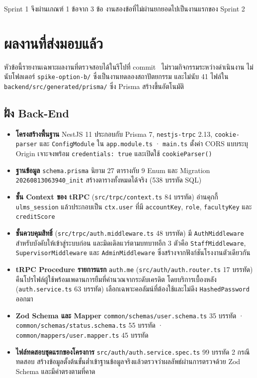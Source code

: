 \vspace{0.8em}
\noindent Sprint 1 จึงผ่านเกณฑ์ 1 ข้อจาก 3 ข้อ งานสองข้อที่ไม่ผ่านยกยอดไปเป็นงานแรกของ Sprint 2

\clearpage
\section{ผลงานที่ส่งมอบแล้ว}

หัวข้อนี้รายงานเฉพาะผลงานที่ตรวจสอบได้ในรีโปที่ commit \headsha\ ไม่รวมกิจกรรมระหว่างดำเนินงาน ไม่นับโฟลเดอร์ \texttt{spike-option-b/} ซึ่งเป็นงานทดลองสถาปัตยกรรม และไม่นับ 41 ไฟล์ใน \texttt{backend/src/generated/prisma/} ซึ่ง Prisma สร้างขึ้นอัตโนมัติ

\subsection{ฝั่ง Back-End}

\begin{itemize}
  \item \textbf{โครงสร้างพื้นฐาน} NestJS 11 ประกอบกับ Prisma 7, \texttt{nestjs-trpc} 2.13, \texttt{cookie-parser} และ \texttt{ConfigModule} ใน \texttt{app.module.ts} · \texttt{main.ts} ตั้งค่า CORS แบบระบุ Origin เจาะจงพร้อม \texttt{credentials: true} และเปิดใช้ \texttt{cookieParser()}
  \item \textbf{ฐานข้อมูล} \texttt{schema.prisma} นิยาม 27 ตารางกับ 9 Enum และ Migration \texttt{20260813063940\zb\_init} สร้างตารางทั้งหมดได้จริง (538 บรรทัด SQL)
  \item \textbf{ชั้น Context ของ tRPC} (\texttt{src/trpc/context.ts} 84 บรรทัด) อ่านคุกกี้ \texttt{ulms\_session} แล้วประกอบเป็น \texttt{ctx.user} ที่มี \texttt{accountKey}, \texttt{role}, \texttt{facultyKey} และ \texttt{creditScore}
  \item \textbf{ชั้นควบคุมสิทธิ์} (\texttt{src/trpc/auth.middleware.ts} 48 บรรทัด) มี \texttt{AuthMiddleware} สำหรับบังคับให้เข้าสู่ระบบก่อน และมิดเดิลแวร์ตามบทบาทอีก 3 ตัวคือ \texttt{StaffMiddleware}, \texttt{Supervisor\zb Middleware} และ \texttt{AdminMiddleware} ซึ่งสร้างจากฟังก์ชันโรงงานตัวเดียวกัน
  \item \textbf{tRPC Procedure รายการแรก} \texttt{auth.me} (\texttt{src/auth/auth.router.ts} 17 บรรทัด) คืนโปรไฟล์ผู้ใช้พร้อมเพดานการยืมที่คำนวณจากระดับเครดิต โดยบริการเบื้องหลัง (\texttt{auth.service.ts} 63 บรรทัด) เลือกเฉพาะคอลัมน์ที่ต้องใช้และไม่ดึง \texttt{HashedPassword} ออกมา
  \item \textbf{Zod Schema และ Mapper} \texttt{common/schemas/user.schema.ts} 35 บรรทัด · \texttt{common/schemas/status.schema.ts} 55 บรรทัด · \texttt{common/mappers/user.mapper.ts} 45 บรรทัด
  \item \textbf{ไฟล์ทดสอบชุดแรกของโครงการ} \texttt{src/auth/auth.service.spec.ts} 99 บรรทัด 2 กรณีทดสอบ สร้างข้อมูลตั้งต้นขั้นต่ำเข้าฐานข้อมูลจริงแล้วตรวจว่าผลลัพธ์ผ่านการตรวจด้วย Zod Schema และมีค่าตรงตามที่คาด
\end{itemize}

